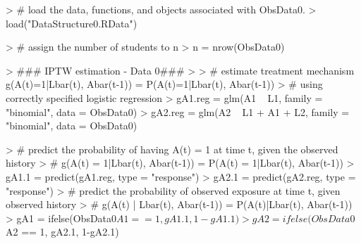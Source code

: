 \documentclass{exam}
\begin{document}
\begin{enumerate}
\begin{solution}
\begin{Schunk}
\begin{Sinput}
> # load the data, functions, and objects associated with ObsData0.
> load("DataStructure0.RData")
\end{Sinput}
\end{Schunk}
\begin{Schunk}
\begin{Sinput}
> # assign the number of students to n
> n = nrow(ObsData0)
\end{Sinput}
\end{Schunk}
\begin{Schunk}
\begin{Sinput}
> ### IPTW estimation - Data 0###
> 
> # estimate treatment mechanism g(A(t)=1|Lbar(t), Abar(t-1)) = P(A(t)=1|Lbar(t), Abar(t-1))
> # using correctly specified logistic regression
> gA1.reg = glm(A1 ~ L1, family = "binomial", data = ObsData0)
> gA2.reg = glm(A2 ~ L1 + A1 +  L2, family = "binomial", data = ObsData0)
\end{Sinput}
\end{Schunk}
\begin{Schunk}
\begin{Sinput}
> # predict the probability of having A(t) = 1 at time t, given the observed history
> # g(A(t) = 1|Lbar(t), Abar(t-1)) = P(A(t) = 1|Lbar(t), Abar(t-1))
> gA1.1 = predict(gA1.reg, type = "response")
> gA2.1 = predict(gA2.reg, type = "response")
> # predict the probability of observed exposure at time t, given observed history
> # g(A(t) | Lbar(t), Abar(t-1)) = P(A(t)|Lbar(t), Abar(t-1))
> gA1 = ifelse(ObsData0$A1 == 1, gA1.1, 1-gA1.1)
> gA2 = ifelse(ObsData0$A2 == 1, gA2.1, 1-gA2.1)
\end{Sinput}
\end{Schunk}


\end{solution}
\end{enumerate}
\end{document}
